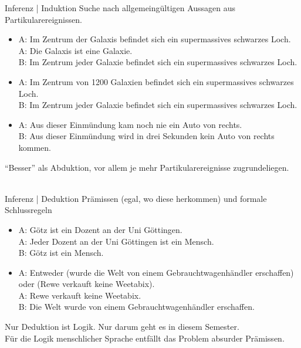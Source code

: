 \begin{frame}
  {Inferenz | Induktion}
  \onslide<+->
  \onslide<+->
  Suche nach \alert{allgemeingültigen Aussagen} aus Partikularereignissen.\\
  \Halbzeile
  \begin{itemize}[<+->]
    \item A: Im Zentrum der Galaxis befindet sich ein supermassives schwarzes Loch.\\
          A: Die Galaxis ist eine Galaxie.\\
          B: Im Zentrum jeder Galaxie befindet sich ein supermassives schwarzes Loch.
    \item A: Im Zentrum von 1200 Galaxien befindet sich ein supermassives schwarzes Loch.\\
          B: Im Zentrum jeder Galaxie befindet sich ein supermassives schwarzes Loch.
    \item A: Aus dieser Einmündung kam noch nie ein Auto von rechts.\\
          B: Aus dieser Einmündung wird in drei Sekunden kein Auto von rechts kommen.
  \end{itemize}
  \onslide<+->
  \Zeile 
  \centering 
  \alert{"`Besser"' als Abduktion, vor allem je mehr Partikularereignisse zugrundeliegen.}\\
  \\
\end{frame}

\begin{frame}
  {Inferenz | Deduktion}
  \onslide<+->
  \onslide<+->
  \alert{Prämissen} (egal, wo diese herkommen) und formale \alert{Schlussregeln}\\
  \Halbzeile
  \begin{itemize}[<+->]
    \item A: Götz ist ein Dozent an der Uni Göttingen.\\
      A: Jeder Dozent an der Uni Göttingen ist ein Mensch.\\
      B: Götz ist ein Mensch.
    \item A: Entweder (wurde die Welt von einem Gebrauchtwagenhändler erschaffen) oder (Rewe verkauft keine Weetabix).\\
      A: Rewe verkauft keine Weetabix.\\
      B: Die Welt wurde von einem Gebrauchtwagenhändler erschaffen.
  \end{itemize}
  \onslide<+->
  \Zeile
  \centering 
  \alert{Nur Deduktion ist Logik. Nur darum geht es in diesem Semester.}\\
  Für die Logik menschlicher Sprache entfällt das Problem absurder Prämissen.
\end{frame}

